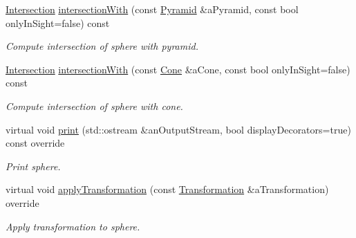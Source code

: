 \begin{DoxyCompactItemize}
\hyperlink{classostk_1_1math_1_1geom_1_1d3_1_1_intersection}{Intersection} \hyperlink{classostk_1_1math_1_1geom_1_1d3_1_1objects_1_1_sphere_acaea609361916447d52597870fbcc512}{intersection\+With} (const \hyperlink{classostk_1_1math_1_1geom_1_1d3_1_1objects_1_1_pyramid}{Pyramid} \&a\+Pyramid, const bool only\+In\+Sight=false) const
\begin{DoxyCompactList}\small\item\em Compute intersection of sphere with pyramid. \end{DoxyCompactList}\item 
\hyperlink{classostk_1_1math_1_1geom_1_1d3_1_1_intersection}{Intersection} \hyperlink{classostk_1_1math_1_1geom_1_1d3_1_1objects_1_1_sphere_acffa995d7b70b3f96513566fbc2545fc}{intersection\+With} (const \hyperlink{classostk_1_1math_1_1geom_1_1d3_1_1objects_1_1_cone}{Cone} \&a\+Cone, const bool only\+In\+Sight=false) const
\begin{DoxyCompactList}\small\item\em Compute intersection of sphere with cone. \end{DoxyCompactList}\item 
virtual void \hyperlink{classostk_1_1math_1_1geom_1_1d3_1_1objects_1_1_sphere_add7bc90c60deddcad6e3486b687a653a}{print} (std\+::ostream \&an\+Output\+Stream, bool display\+Decorators=true) const override
\begin{DoxyCompactList}\small\item\em Print sphere. \end{DoxyCompactList}\item 
virtual void \hyperlink{classostk_1_1math_1_1geom_1_1d3_1_1objects_1_1_sphere_a421357bf4058e68e0aa636f606c6b249}{apply\+Transformation} (const \hyperlink{classostk_1_1math_1_1geom_1_1d3_1_1_transformation}{Transformation} \&a\+Transformation) override
\begin{DoxyCompactList}\small\item\em Apply transformation to sphere. \end{DoxyCompactList}\end{DoxyCompactItemize}
